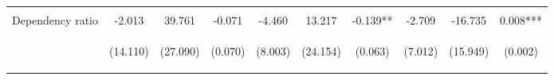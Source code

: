 \begin{center}
\begin{tabular}{lccccccccc}
\vspace{4pt} & \begin{footnotesize}[0.528]\end{footnotesize} & \begin{footnotesize}[0.957]\end{footnotesize} & \begin{footnotesize}[0.038]\end{footnotesize} & \begin{footnotesize}[0.937]\end{footnotesize} & \begin{footnotesize}[0.642]\end{footnotesize} & \begin{footnotesize}[0.294]\end{footnotesize} & \begin{footnotesize}[0.068]\end{footnotesize} & \begin{footnotesize}[0.046]\end{footnotesize} & \begin{footnotesize}[0.951]\end{footnotesize} \\
Dependency ratio & -2.013 & 39.761 & -0.071 & -4.460 & 13.217 & -0.139** & -2.709 & -16.735 & 0.008*** \\
 & \begin{footnotesize}(14.110)\end{footnotesize} & \begin{footnotesize}(27.090)\end{footnotesize} & \begin{footnotesize}(0.070)\end{footnotesize} & \begin{footnotesize}(8.003)\end{footnotesize} & \begin{footnotesize}(24.154)\end{footnotesize} & \begin{footnotesize}(0.063)\end{footnotesize} & \begin{footnotesize}(7.012)\end{footnotesize} & \begin{footnotesize}(15.949)\end{footnotesize} & \begin{footnotesize}(0.002)\end{footnotesize} \\

\end{tabular}
\end{center}
